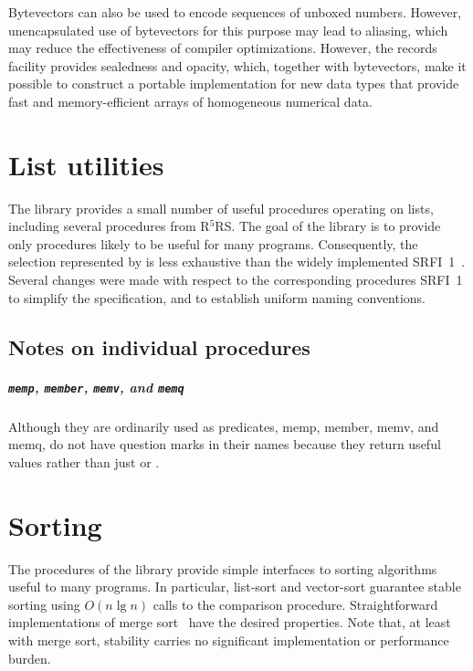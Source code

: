 \documentclass[twoside,twocolumn]{algol60}
\newcommand{\rn}[1]{R$^{#1}$RS}
\begin{document}
Bytevectors can also be used to encode sequences of unboxed numbers.
However, unencapsulated use of bytevectors for this purpose may lead
to aliasing, which may reduce the effectiveness of compiler
optimizations.  However, the records facility provides sealedness and
opacity, which, together with bytevectors, make it possible to
construct a portable implementation for new data types that
provide fast and memory-efficient arrays of homogeneous numerical
data.

\chapter{List utilities}

The  library provides a small number of useful
procedures operating on lists, including several procedures from
\rn{5}.  The goal of the library is to provide only procedures likely
to be useful for many programs.  Consequently, the selection
represented by  is less exhaustive than the widely
implemented SRFI~1~\cite{srfi1}.  Several changes were made with
respect to the corresponding procedures SRFI~1 to simplify the
specification, and to establish uniform naming conventions.

\section{Notes on individual procedures}

\paragraph{{\tt memp}, {\tt member}, {\tt memv}, and {\tt memq}}

Although they are ordinarily used as predicates, {\cf memp}, {\cf
  member}, {\cf memv}, and {\cf memq}, do not have question marks in
their names because they return useful values rather than just
\schtrue{} or \schfalse{}.

\chapter{Sorting}

The procedures of the  library provide simple
interfaces to sorting algorithms useful to many programs.  In
particular, {\cf list-sort} and {\cf vector-sort} guarantee stable
sorting using $O(n \lg n)$ calls to the comparison procedure.
Straightforward implementations of merge sort~\cite{algorithms} have
the desired properties.  Note that, at least with merge sort,
stability carries no significant implementation or performance burden.
\end{document}
